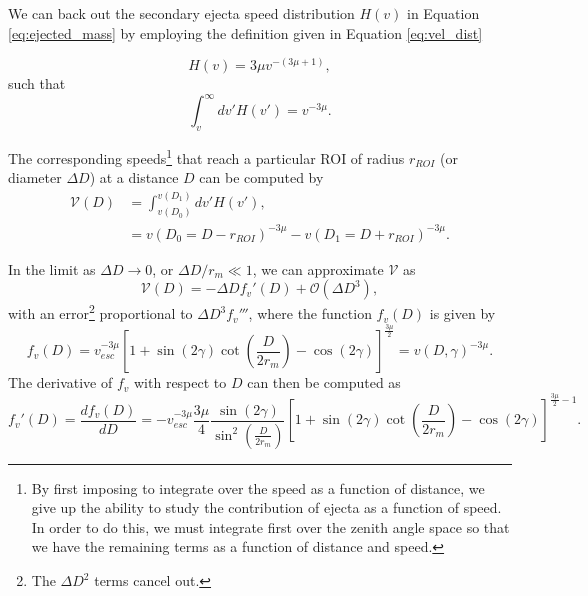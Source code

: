 \documentclass{hitec}
\numberwithin{equation}{section}
\begin{document}
We can back out the secondary ejecta speed distribution $H(v)$ in Equation \eqref{eq:ejected_mass} by employing the definition given in Equation \eqref{eq:vel_dist}

\begin{equation}\label{eq:vel_dist-repeat}
H(v) = 3\mu v^{-(3\mu+1)},
\end{equation}
such that
\begin{equation}
\int_{v}^{\infty}dv'H(v') = v^{-3\mu}.
\end{equation}

The corresponding speeds\footnote{By first imposing to integrate over the speed as a function of distance, we give up the ability to study the contribution of ejecta as a function of speed. In order to do this, we must integrate first over the zenith angle space so that we have the remaining terms as a function of distance and speed.} that reach a particular ROI of radius $r_{ROI}$ (or diameter $\Delta D$) at a distance $D$ can be computed by
\begin{align}
\mathcal{V}(D) &= \int_{v(D_0)}^{v(D_1)}dv'H(v'),\\
&= v(D_0 = D - r_{ROI})^{-3\mu} - v(D_1 = D + r_{ROI})^{-3\mu}.
\end{align}

In the limit as $\Delta D \to 0$, or $\Delta D/r_m \ll 1$, we can approximate $\mathcal{V}$ as
\begin{equation}
\mathcal{V}(D) = -\Delta D f_v'(D) + \mathcal{O}(\Delta D^3),
\end{equation}
with an error\footnote{The $\Delta D^2$ terms cancel out.} proportional to $\Delta D^3f_v'''$, where the function $f_v(D)$ is given by
\begin{equation}
f_v(D) = v_{esc}^{-3\mu}\left[1+\sin(2\gamma)\cot\left(\frac{D}{2r_m}\right) - \cos(2\gamma)\right]^{\frac{3\mu}{2}} = v(D,\gamma)^{-3\mu}.
\end{equation}
The derivative of $f_v$ with respect to $D$ can then be computed as
\begin{equation}\label{eq:fv'}
f_v'(D) = \frac{df_v(D)}{dD} = -v_{esc}^{-3\mu}\frac{3\mu}{4}\frac{\sin(2\gamma)}{\sin^2\left(\frac{D}{2r_m}\right)}\left[1+\sin(2\gamma)\cot\left(\frac{D}{2r_m}\right) - \cos(2\gamma)\right]^{\frac{3\mu}{2}-1}.
\end{equation}
\end{document}
